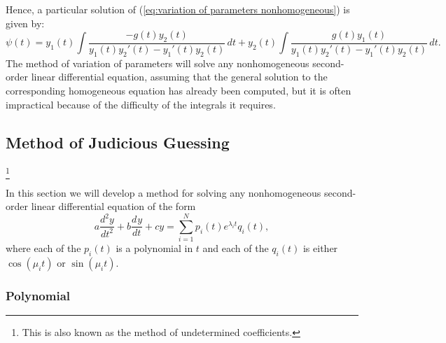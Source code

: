 \documentclass{myart}
\newcommand{\eq}[1]{(\ref{eq:#1})}
\newcommand{\deriv}[3][]{\frac{d^{#1}#2}{d#3^{#1}}}
\begin{document}
Hence, a particular solution of \eq{variation of parameters
  nonhomogeneous} is given by:
\begin{equation*}
  \psi(t) = y_1(t) \int \frac{-g(t)y_2(t)}{y_1(t)y_2'(t)
          - y_1'(t)y_2(t)} \,dt
          + y_2(t) \int \frac{g(t)y_1(t)}{y_1(t)y_2'(t)
          - y_1'(t)y_2(t)} \,dt.
\end{equation*}
The method of variation of parameters will solve any nonhomogeneous
second-order linear differential equation, assuming that the general
solution to the corresponding homogeneous equation has already been
computed, but it is often impractical because of the difficulty of the
integrals it requires.

\subsection{Method of Judicious Guessing}
\footnote{This is also known as the method of undetermined
  coefficients.}
\label{subsec:judicious guessing}

In this section we will develop a method for solving any
nonhomogeneous second-order linear differential equation of the form
\begin{equation*}
    a \deriv[2]{y}{t} + b \deriv{y}{t} + cy
  = \sum_{i=1}^N p_i(t)e^{\lambda_i t}q_i(t),
\end{equation*}
where each of the $p_i(t)$ is a polynomial in $t$ and each of the
$q_i(t)$ is either $\cos(\mu_i t)$ or $\sin(\mu_i t)$.

\subsubsection{Polynomial}
\label{subsubsec:judicious guessing polynomial}
\end{document}

